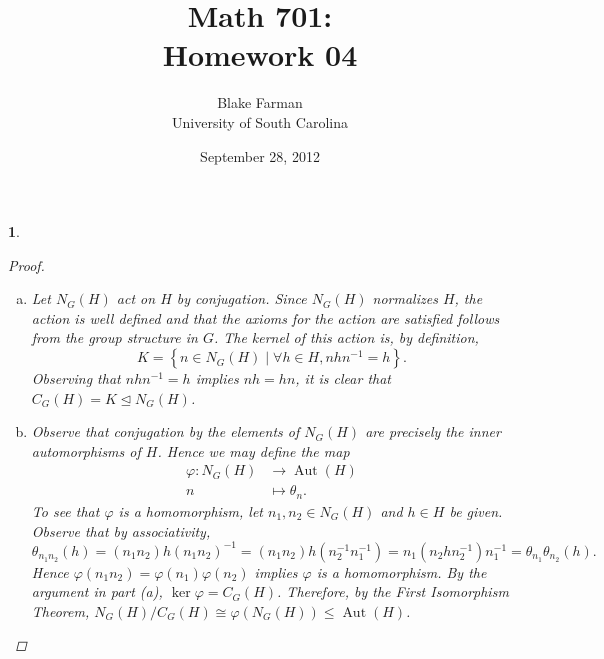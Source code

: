 \documentclass[10pt]{amsart}
\author{Blake Farman\\University of South Carolina}
\title{Math 701:\\Homework 04}
\date{September 28, 2012}
\begin{document}
\maketitle

\newcommand{\Inn}[1]{\operatorname{Inn}\left(#1\right)}
\newcommand{\Aut}[1]{\operatorname{Aut}\left(#1\right)}
\newcommand{\cntr}[1]{\mathbf{Z}\left(#1\right)}
\newcommand{\abs}[1]{\left| #1 \right|}
\newcommand{\SL}[2]{\operatorname{SL}_#1\left(#2\right)}
\newcommand{\Mat}[2]{\operatorname{Mat}_{#1}\left(#2\right)}
\newcommand{\orbit}[1]{\mathcal{O}_{#1}}
\newcommand{\real}[1]{\operatorname{\mathfrak{Re}}\left(#1\right)}
\newcommand{\imag}[1]{\operatorname{\mathfrak{Im}}\left(#1\right)}
\newcommand{\uhp}{\mathfrak{h}}

\renewcommand{\qedsymbol}{\ensuremath{\blacksquare}}

\newtheorem{thm}{}
\newtheorem{lem}{Lemma}

\begin{thm}
  \begin{proof}
    \begin{enumerate}[(a)]
      \item
        Let $N_G(H)$ act on $H$ by conjugation.
        Since $N_G(H)$ normalizes $H$, the action is well defined and that the axioms for the action are satisfied follows from the group structure in $G$.
        The kernel of this action is, by definition, 
        $$K = \left\{n \in N_G(H) \mid \forall h \in H, nhn^{-1} = h\right\}.$$ 
        Observing that $nhn^{-1} = h$ implies $nh = hn$, it is clear that $C_G(H) = K \unlhd N_G(H)$.
      \item
        Observe that conjugation by the elements of $N_G(H)$ are precisely the inner automorphisms of $H$.
        Hence we may define the map
        \begin{align*}
          \varphi \colon N_G(H) &\rightarrow \Aut{H}\\
          n &\mapsto \theta_n.
        \end{align*}
        To see that $\varphi$ is a homomorphism, let $n_1,n_2 \in N_G(H)$ and $h \in H$ be given.
        Observe that by associativity, $$\theta_{n_1n_2}(h) = (n_1n_2)h(n_1n_2)^{-1} = (n_1n_2) h (n_2^{-1}n_1^{-1}) = n_1(n_2 h n_2^{-1})n_1^{-1} = \theta_{n_1}\theta_{n_2}(h).$$
        Hence $\varphi(n_1n_2) = \varphi(n_1)\varphi(n_2)$ implies $\varphi$ is a homomorphism.
        By the argument in part (a), $\ker\varphi = C_G(H)$.
        Therefore, by the First Isomorphism Theorem, $N_G(H)/C_G(H) \cong \varphi(N_G(H)) \leq \Aut{H}$.
    \end{enumerate}
  \end{proof}
\end{thm}
\end{document}
